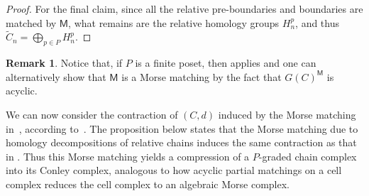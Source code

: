 \documentclass[11pt, table, nothms]{amsart}
\theoremstyle{definition}
\newtheorem{remark}[theorem]{Remark}
\newcommand{\sM}{\mathsf{M}}
\begin{document}
{\begin{proof}
For the final claim, since all the relative pre-boundaries and boundaries are matched by $\sM$, what remains are the relative homology groups $H^p_n$, and thus $\widetilde{C}_n= \bigoplus_{p \in P} H^p_n$.
\end{proof}
\begin{remark}
    Notice that, if $P$ is a finite poset, then  applies and one can alternatively show that $\sM$ is a Morse matching by the fact that $G(C)^\sM$ is acyclic.
\end{remark}
We can now consider the contraction of $(C,d)$ induced by the Morse matching in~, according to~. The proposition below states that the Morse matching due to homology decompositions of relative chains induces the same contraction as that in . Thus this Morse matching yields a compression of a $P$-graded chain complex into its Conley complex, analogous to how acyclic partial matchings on a cell complex reduces the cell complex to an algebraic Morse complex. 

}
\end{document}
